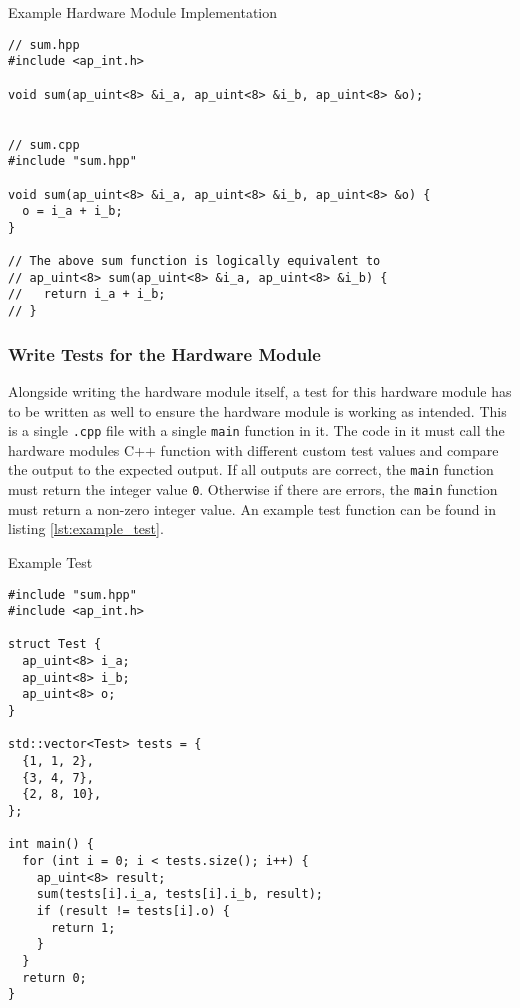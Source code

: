 \begin{listing}
  \caption{Example Hardware Module Implementation}
  \begin{verbatim}
// sum.hpp
#include <ap_int.h>

void sum(ap_uint<8> &i_a, ap_uint<8> &i_b, ap_uint<8> &o);


// sum.cpp
#include "sum.hpp"

void sum(ap_uint<8> &i_a, ap_uint<8> &i_b, ap_uint<8> &o) {
  o = i_a + i_b;
}

// The above sum function is logically equivalent to
// ap_uint<8> sum(ap_uint<8> &i_a, ap_uint<8> &i_b) {
//   return i_a + i_b;
// }
  \end{verbatim}
  \label{lst:example_hardware_module}
\end{listing}

\subsubsection{Write Tests for the Hardware Module}
Alongside writing the hardware module itself, a test for this hardware module has to be written as well to ensure the hardware module is working as intended. This is a single \texttt{.cpp} file with a single \texttt{main} function in it. The code in it must call the hardware modules C++ function with different custom test values and compare the output to the expected output. If all outputs are correct, the \texttt{main} function must return the integer value \texttt{0}. Otherwise if there are errors, the \texttt{main} function must return a non-zero integer value. An example test function can be found in listing \ref{lst:example_test}.

\begin{listing}
  \caption{Example Test}
  \begin{verbatim}
#include "sum.hpp"
#include <ap_int.h>

struct Test {
  ap_uint<8> i_a;
  ap_uint<8> i_b;
  ap_uint<8> o;
}

std::vector<Test> tests = {
  {1, 1, 2},
  {3, 4, 7},
  {2, 8, 10},
};

int main() {
  for (int i = 0; i < tests.size(); i++) {
    ap_uint<8> result;
    sum(tests[i].i_a, tests[i].i_b, result);
    if (result != tests[i].o) {
      return 1;
    }
  }
  return 0;
}
  \end{verbatim}
  \label{lst:example_test}
\end{listing}

